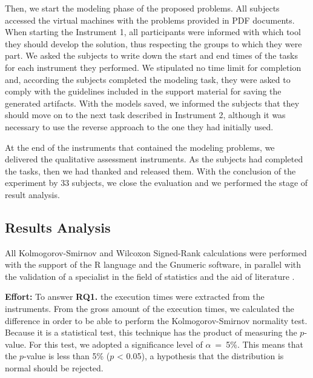 Then, we start the modeling phase of the proposed problems.
All subjects accessed the virtual machines with the problems provided in PDF documents.
When starting the Instrument 1, all participants were informed with which tool they should develop the solution, thus respecting the groups to which they were part.
We asked the subjects to write down the start and end times of the tasks for each instrument they performed.
We stipulated no time limit for completion and, according the subjects completed the modeling task, they were asked to comply with the guidelines included in the support material for saving the generated artifacts.
With the models saved, we informed the subjects that they should move on to the next task described in Instrument 2, although it was necessary to use the reverse approach to the one they had initially used.

At the end of the instruments that contained the modeling problems, we delivered the qualitative assessment instruments.
As the subjects had completed the tasks, then we had thanked and released them.
With the conclusion of the experiment by 33 subjects, we close the evaluation and we performed the stage of result analysis.


\subsection{Results Analysis}
\label{ssec_experiments:preliminary_resultAnalysis}

All Kolmogorov-Smirnov and Wilcoxon Signed-Rank calculations were performed with the support of the R language and the Gnumeric software, in parallel with the validation of a specialist in the field of statistics and the aid of literature \cite{Triola:2018}.

\textbf{Effort:} To answer \textbf{RQ1.} 
the execution times were extracted from the instruments.
From the gross amount of the execution times, we calculated the difference in order to be able to perform the Kolmogorov-Smirnov normality test.
Because it is a statistical test, this technique has the product of measuring the $p$-value.
For this test, we adopted a significance level of $\alpha$~=~5\%.
This means that the $p$-value is less than 5\% ($p$ < 0.05), a hypothesis that the distribution is normal should be rejected.

